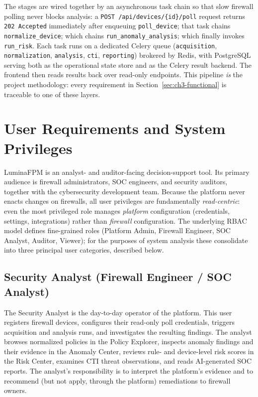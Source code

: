 The stages are wired together by an asynchronous task chain so that slow firewall polling never blocks analysis: a \texttt{POST /api/devices/\{id\}/poll} request returns \texttt{202~Accepted} immediately after enqueuing \texttt{poll\_device}; that task chains \texttt{normalize\_device}; which chains \texttt{run\_anomaly\_analysis}; which finally invokes \texttt{run\_risk}. Each task runs on a dedicated Celery queue (\texttt{acquisition}, \texttt{normalization}, \texttt{analysis}, \texttt{cti}, \texttt{reporting}) brokered by Redis, with PostgreSQL serving both as the operational state store and as the Celery result backend. The frontend then reads results back over read-only endpoints. This pipeline \emph{is} the project methodology: every requirement in Section~\ref{sec:ch3-functional} is traceable to one of these layers.

\section{User Requirements and System Privileges}
\label{sec:ch3-users}

LuminaFPM is an analyst- and auditor-facing decision-support tool. Its primary audience is firewall administrators, SOC engineers, and security auditors, together with the cybersecurity development team. Because the platform never enacts changes on firewalls, all user privileges are fundamentally \emph{read-centric}: even the most privileged role manages \emph{platform} configuration (credentials, settings, integrations) rather than \emph{firewall} configuration. The underlying RBAC model defines fine-grained roles (Platform Admin, Firewall Engineer, SOC Analyst, Auditor, Viewer); for the purposes of system analysis these consolidate into three principal user categories, described below.

\subsection{Security Analyst (Firewall Engineer / SOC Analyst)}
\label{sec:ch3-user-analyst}
The Security Analyst is the day-to-day operator of the platform. This user registers firewall devices, configures their read-only poll credentials, triggers acquisition and analysis runs, and investigates the resulting findings. The analyst browses normalized policies in the Policy Explorer, inspects anomaly findings and their evidence in the Anomaly Center, reviews rule- and device-level risk scores in the Risk Center, examines CTI threat observations, and reads AI-generated SOC reports. The analyst's responsibility is to interpret the platform's evidence and to recommend (but not apply, through the platform) remediations to firewall owners.

